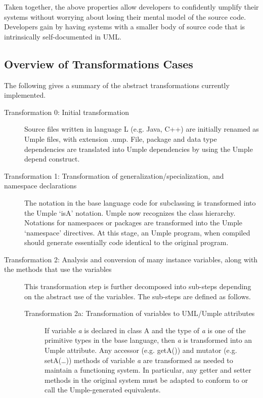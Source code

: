 Taken together, the above properties allow developers to confidently umplify their systems without worrying about losing their mental model of the source code. Developers gain by having systems with a smaller body of source code that is intrinsically self-documented in UML. 

\subsection{Overview of Transformations Cases}
\label{subsection:overview}
The following gives a summary of the abstract transformations currently implemented. 
\begin{description} 
\item[Transformation 0: Initial transformation] 
Source files written in language L (e.g. Java, C++) are initially renamed as Umple files, with extension .ump. File, package and data type dependencies are translated into Umple dependencies by using the Umple depend construct. 

\item [Transformation 1: Transformation of generalization/specialization, and namespace declarations]
The notation in the base language code for subclassing is transformed into the Umple `isA' notation. Umple now recognizes the class hierarchy. Notations for namespaces or packages are transformed into the Umple `namespace' directives. At this stage, an Umple program, when compiled should generate essentially code identical to the original program.

\item [Transformation 2: Analysis and conversion of many instance variables, along with the methods that use the variables]
This transformation step is further decomposed into sub-steps depending on the abstract use of the variables. The sub-steps are defined as follows.
	\begin{description}

	\item [Transformation 2a: Transformation of variables to UML/Umple attributes]
	If variable \textit{a} is declared in class A and the type of \textit{a} is one of the primitive types in the base language, then \textit{a} is transformed into an Umple attribute. Any accessor (e.g. getA()) and mutator (e.g. setA(…)) methods of variable \textit{a} are transformed as needed to maintain a functioning system. In particular, any getter and setter methods in the original system must be adapted to conform to or call the Umple-generated equivalents.
	

\end{description}
\end{description}
